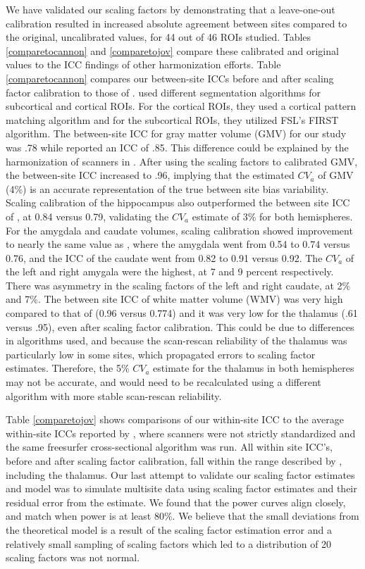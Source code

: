 We have validated our scaling factors by demonstrating that a leave-one-out calibration resulted in increased absolute agreement between sites compared to the original, uncalibrated values, for 44 out of 46 ROIs studied. Tables \ref{comparetocannon} and \ref{comparetojov} compare these calibrated and original values to the ICC findings of other harmonization efforts. Table \ref{comparetocannon} compares our between-site ICCs before and after scaling factor calibration to those of \cite{cannon2014}. \cite{cannon2014} used different segmentation algorithms for subcortical and cortical ROIs. For the cortical ROIs, they used a cortical pattern matching algorithm \cite{thompson2001detecting} and for the subcortical ROIs, they utilized FSL's FIRST algorithm. The between-site ICC for gray matter volume (GMV) for our study was .78 while \cite{cannon2014} reported an ICC of .85. This difference could be explained by the harmonization of scanners in \cite{cannon2014}. After using the scaling factors to calibrated GMV, the between-site ICC increased to .96, implying that the estimated $CV_a$ of GMV (4\%) is an accurate representation of the true between site bias variability. Scaling calibration of the hippocampus also outperformed the between site ICC of \cite{cannon2014}, at 0.84 versus 0.79, validating the $CV_a$ estimate of 3\% for both hemispheres. For the amygdala and caudate volumes, scaling calibration showed improvement to nearly the same value as \cite{cannon2014}, where the amygdala went from 0.54 to 0.74 versus 0.76, and the ICC of the caudate went from 0.82 to 0.91 versus 0.92. The $CV_a$ of the left and right amygala were the highest, at 7 and 9 percent respectively. There was asymmetry in the scaling factors of the left and right caudate, at 2\% and 7\%. The between site ICC of white matter volume (WMV) was very high compared to that of \cite{cannon2014} (0.96 versus 0.774) and it was very low for the thalamus (.61 versus .95), even after scaling factor calibration. This could be due to differences in algorithms used, and because the scan-rescan reliability of the thalamus was particularly low in some sites, which propagated errors to scaling factor estimates. Therefore, the 5\% $CV_a$ estimate for the thalamus in both hemispheres may not be accurate, and would need to be recalculated using a different algorithm with more stable scan-rescan reliability. 

Table \ref{comparetojov} shows comparisons of our within-site ICC to the average within-site ICCs reported by \cite{jovicich2013brain}, where scanners were not strictly standardized and the same freesurfer cross-sectional algorithm was run. All within site ICC's, before and after scaling factor calibration, fall within the range described by \cite{jovicich2013brain}, including the thalamus.  Our last attempt to validate our scaling factor estimates and model was to simulate multisite data using scaling factor estimates and their residual error from the estimate. We found that the power curves align closely, and match when power is at least 80\%. We believe that the small deviations from the theoretical model is a result of the scaling factor estimation error and a relatively small sampling of scaling factors which led to a distribution of 20 scaling factors was not normal.  

